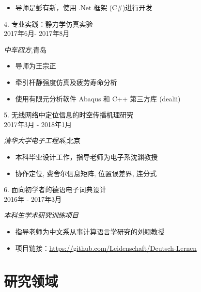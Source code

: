 \documentclass[12pt]{moderncv}
\begin{document}
\normalsize{\begin{itemize}
		\item 导师是彭有新，使用 .Net 框架 (C\#)进行开发
\end{itemize}}

{\raggedright\large 4. 专业实践：静力学仿真实验\\
\raggedleft\small \textsc{2017年6月- 2017年8月}\par \textit{中车四方},青岛\\[5pt]}

\normalsize{\begin{itemize}
		\item 导师为王宗正
		\item 牵引杆静强度仿真及疲劳寿命分析
		\item 使用有限元分析软件  Abaqus 和 C++ 第三方库 (dealii)
\end{itemize}}

{\raggedleft\par}

{\raggedright\large 5. 无线网络中定位信息的时空传播机理研究\\
\raggedleft\small	\textsc{2017年3月 - 2018年1月}\par \textit{清华大学电子工程系},北京 \\[5pt]}

\normalsize{\begin{itemize}
		\item 本科毕业设计工作，指导老师为电子系沈渊教授
		\item 协作定位, 费舍尔信息矩阵, 位置误差界, 连分式
\end{itemize}}

{\raggedright\large 6. 面向初学者的德语电子词典设计\\
\raggedleft\small	\textsc{2016年 - 2017年3月}\par \textit{本科生学术研究训练项目} \\[5pt]}

\normalsize{\begin{itemize}
		\item 指导老师为中文系从事计算语言学研究的刘颖教授
		\item 项目链接：\url{https://github.com/Leidenschaft/Deutsch-Lernen}
\end{itemize}}


\section{研究领域}
\end{document}
